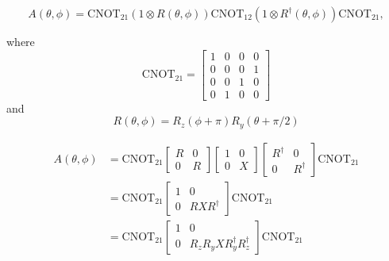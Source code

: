 \documentclass[11pt, oneside]{article}   	%
\begin{document}
\begin{equation}
A(\theta, \phi) = \mathrm{CNOT}_{21} \left(1 \otimes R(\theta, \phi) \right) \mathrm{CNOT}_{12} \left(1 \otimes R^{\dagger}(\theta, \phi) \right) \mathrm{CNOT}_{21},
\end{equation}

where 
\begin{equation}
\mathrm{CNOT}_{21} = 
\begin{bmatrix}
1 & 0 & 0 & 0 \\
0 & 0 & 0 & 1 \\
0 & 0 & 1 & 0 \\
0 & 1 & 0 & 0
\end{bmatrix}
\end{equation}
and 
\begin{equation}
R(\theta, \phi) = R_z (\phi + \pi) R_y (\theta + \pi/2) 
\end{equation}

\begin{align}
A(\theta, \phi) 
&= \mathrm{CNOT}_{21} 
\begin{bmatrix}
R & 0 \\
0 & R
\end{bmatrix}
\begin{bmatrix}
1 & 0 \\
0 & X
\end{bmatrix}
\begin{bmatrix}
R^{\dagger} & 0 \\
0 & R^{\dagger}
\end{bmatrix}
\mathrm{CNOT}_{21} \\
&= \mathrm{CNOT}_{21} 
\begin{bmatrix}
1 & 0 \\
0 & R X R^{\dagger}
\end{bmatrix}
\mathrm{CNOT}_{21} \\
&= \mathrm{CNOT}_{21}
\begin{bmatrix}
1 & 0 \\
0 & R_z R_y X R^{\dagger}_y R^{\dagger}_z
\end{bmatrix}
\mathrm{CNOT}_{21} 
\end{align}
\end{document}
